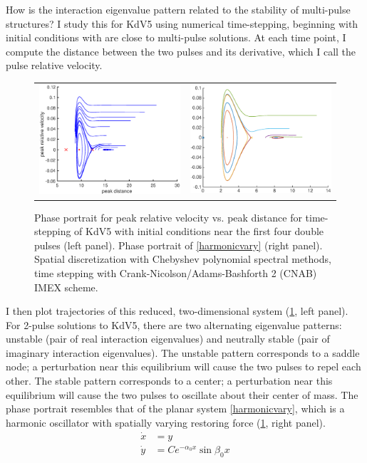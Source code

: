 \documentclass[12pt,reqno,oneside]{article}
\theoremstyle{definition}
\theoremstyle{remark}
\begin{document}
How is the interaction eigenvalue pattern related to the stability of multi-pulse structures? I study this for KdV5 using numerical time-stepping, beginning with initial conditions with are close to multi-pulse solutions. At each time point, I compute the distance between the two pulses and its derivative, which I call the pulse relative velocity.
\begin{figure}[H]
\begin{center}
\begin{tabular}{cc}
\includegraphics[width=6.5cm]{images/phaseportrait}  &
\includegraphics[width=6.5cm]{images/simplephaseportrait}
\end{tabular}
\end{center}
\caption{Phase portrait for peak relative velocity vs. peak distance for time-stepping of KdV5 with initial conditions near the first four double pulses (left panel). Phase portrait of \cref{harmonicvary} (right panel). Spatial discretization with Chebyshev polynomial spectral methods, time stepping with Crank-Nicolson/Adams-Bashforth 2 (CNAB) IMEX scheme.
}
\label{fig:KdV5timestep}
\end{figure}
I then plot trajectories of this reduced, two-dimensional system (\cref{fig:KdV5timestep}, left panel). For 2-pulse solutions to KdV5, there are two alternating eigenvalue patterns: unstable (pair of real interaction eigenvalues) and neutrally stable (pair of imaginary interaction eigenvalues). The unstable pattern corresponds to a saddle node; a perturbation near this equilibrium will cause the two pulses to repel each other. The stable pattern corresponds to a center; a perturbation near this equilibrium will cause the two pulses to oscillate about their center of mass. The phase portrait resembles that of the planar system \eqref{harmonicvary}, which is a harmonic oscillator with spatially varying restoring force (\cref{fig:KdV5timestep}, right panel).
\begin{equation}\label{harmonicvary}
\begin{aligned}
\dot{x} &= y \\
\dot{y} &= C e^{-\alpha_0 x} \sin \beta_0 x
\end{aligned}
\end{equation} 
\end{document}
